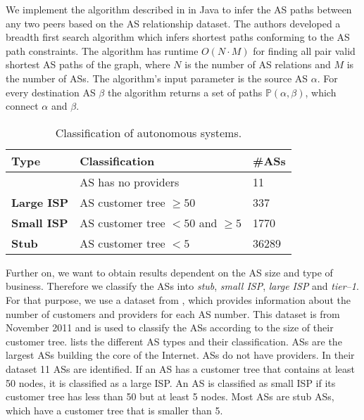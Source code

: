 We implement the algorithm described in \cite{yang2009efficient} in Java to infer the AS paths between any two peers based on the AS relationship dataset. The authors developed a breadth first search algorithm which infers shortest paths conforming to the AS path constraints. The algorithm has runtime $O(N\cdot M)$ for finding all pair valid shortest AS paths of the graph, where $N$ is the number of AS relations and $M$ is the number of ASs.
The algorithm's input parameter is the source AS $\alpha$. For every destination AS $\beta$ the algorithm returns a set of paths $\mathbb{P}(\alpha,\beta)$, which connect $\alpha$ and $\beta$.

\begin{table}[tb]
\caption{Classification of autonomous systems.} \label{tab:ASclass}
\begin{center}
{\footnotesize
	\begin{tabular}{|l|l|l|} \hline
		\textbf{Type} & \textbf{Classification} & \textbf{\#ASs} \\ \hline
		\textbf{\Tier} & AS has no providers & 11 \\ \hline
		\textbf{Large ISP} & AS customer tree $\geq50$ & 337 \\ \hline
		\textbf{Small ISP} & AS customer tree $<50$ and $\geq5$ & 1770 \\ \hline
		\textbf{Stub} & AS customer tree $<5$ & 36289 \\ \hline
	\end{tabular}
}
\end{center}
\end{table}

Further on, we want to obtain results dependent on the AS size and type of business. Therefore we classify the ASs into \textit{stub}, \textit{small ISP}, \textit{large ISP} and \textit{tier--1}. For that purpose, we use a dataset from \cite{irlas}, which provides information about the number of customers and providers for each AS number. This dataset is from November 2011 and is used to classify the ASs according to the size of their customer tree.
 lists the different AS types and their classification. \Tier ASs are the largest ASs building the core of the Internet. \Tier ASs do not have providers. In their dataset 11 \tier ASs are identified. If an AS has a customer tree that contains at least 50 nodes, it is classified as a large ISP. An AS is classified as small ISP if its customer tree has less than 50 but at least 5 nodes. Most ASs are stub ASs, which have a customer tree that is smaller than 5.

